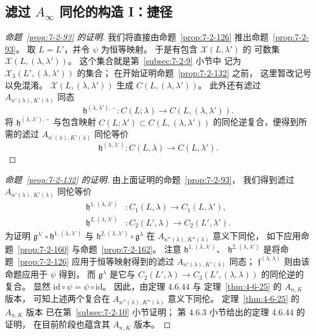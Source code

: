 
\subsection{滤过 $A_\infty$ 同伦的构造 I：捷径}
\label{subsec:7-2-11}

\begin{proof}[命题~\ref{prop:7-2-93} 的证明]
我们将直接由命题~\ref{prop:7-2-126}
推出命题~\ref{prop:7-2-93}。
取 $L=L'$，并令 $\psi$ 为恒等映射。
于是有包含 $\mathcal X(L,\lambda')$ 的
可数集 $\mathcal X(L,(\lambda,\lambda'))$。
这个集合就是第~\ref{subsec:7-2-9} 小节中
记为 $\mathcal X_3(L',(\lambda,\lambda'))$ 的集合；
在开始证明命题~\ref{prop:7-2-132} 之前，
这里暂改记号以免混淆。
$\mathcal X(L,(\lambda,\lambda'))$
生成 $C(L,(\lambda,\lambda'))$。
此外还有滤过
$A_{n'(\lambda),K'(\lambda)}$ 同态
\[
\mathfrak h^{(\lambda,\lambda'),-}\colon
C(L;\lambda)\longrightarrow C(L,(\lambda,\lambda')) .
\]
将 $\mathfrak h^{(\lambda,\lambda'),-}$
与包含映射
$C(L;\lambda')\subset C(L,(\lambda,\lambda'))$
的同伦逆复合，便得到所需的滤过
$A_{n'(\lambda),K'(\lambda)}$ 同伦等价
\[
\mathfrak h^{(\lambda,\lambda')}\colon
C(L,\lambda)\longrightarrow C(L,\lambda').
\]
\end{proof}

\begin{proof}[命题~\ref{prop:7-2-132} 的证明]
由上面证明的命题~\ref{prop:7-2-93}，
我们得到滤过
$A_{n'(\lambda),K'(\lambda)}$ 同伦等价
\[
\begin{aligned}
\mathfrak h^{1,(\lambda,\lambda')}&\colon
C_1(L,\lambda)\longrightarrow C_1(L,\lambda'),\\
\mathfrak h^{2,(\lambda,\lambda')}&\colon
C_2(L',\lambda)\longrightarrow C_2(L',\lambda').
\end{aligned}
\]
为证明
$\mathfrak g^{\lambda'}\circ
\mathfrak h^{1,(\lambda,\lambda')}$
与
$\mathfrak h^{2,(\lambda,\lambda')}\circ
\mathfrak g^\lambda$
在 $A_{n''(\lambda),K''(\lambda)}$ 意义下同伦，
如下应用命题~\ref{prop:7-2-160}
与命题~\ref{prop:7-2-162}。
注意
$\mathfrak h^{1,(\lambda,\lambda')}$、
$\mathfrak h^{2,(\lambda,\lambda')}$
是将命题~\ref{prop:7-2-126}
应用于恒等映射得到的滤过
$A_{n'(\lambda),K'(\lambda)}$ 同态；
$\mathfrak f^{(\lambda,\lambda)}$
则由该命题应用于 $\psi$ 得到，
而 $\mathfrak g^\lambda$ 是它与
$C_2(L',\lambda)\to C_3(L',(\lambda,\lambda))$
的同伦逆的复合。
显然 $\mathrm{id}\circ\psi=\psi\circ\mathrm{id}$。
因此，由定理 4.6.44 与
定理~\ref{thm:4-6-25} 的 $A_{n,K}$ 版本，
可知上述两个复合在
$A_{n''(\lambda),K''(\lambda)}$ 意义下同伦。
定理~\ref{thm:4-6-25} 的 $A_{n,K}$ 版本
已在第~\ref{subsec:7-2-10} 小节证明；
第 4.6.3 小节给出的定理 4.6.44 的证明，
在目前阶段也蕴含其 $A_{n,K}$ 版本。
\end{proof}

